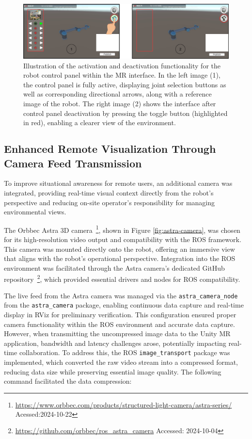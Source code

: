 \begin{figure}[h]
    \centering
    \includegraphics[width=\linewidth]{figs/mao-toca-ui-refeita-numbers.png}
    \caption{Illustration of the activation and deactivation functionality for the robot control panel within the \ac{MR} interface. In the left image (1), the control panel is fully active, displaying joint selection buttons as well as corresponding directional arrows, along with a reference image of the robot. The right image (2) shows the interface after control panel deactivation by pressing the toggle button (highlighted in red), enabling a clearer view of the environment.}
    \label{fig:menu-toggle-button}
\end{figure}



\subsection{Enhanced Remote Visualization Through Camera Feed Transmission}

To improve situational awareness for remote users, an additional camera was integrated, providing real-time visual context directly from the robot’s perspective and reducing on-site operator's responsibility for managing environmental views.

The Orbbec Astra 3D camera~\footnote{\url{https://www.orbbec.com/products/structured-light-camera/astra-series/} Acessed:2024-10-22}, shown in Figure \ref{fig:astra-camera}, was chosen for its high-resolution video output and compatibility with the \ac{ROS} framework. This camera was mounted directly onto the robot, offering an immersive view that aligns with the robot’s operational perspective. Integration into the \ac{ROS} environment was facilitated through the Astra camera’s dedicated GitHub  repository~\footnote{\url{https://github.com/orbbec/ros\_astra\_camera} Accessed: 2024-10-04}, which provided essential drivers and nodes for \ac{ROS} compatibility.

The live feed from the Astra camera was managed via the \texttt{astra\_camera\_node} from the \texttt{astra\_camera} package, enabling continuous data capture and real-time display in RViz for preliminary verification. This configuration ensured proper camera functionality within the \ac{ROS} environment and accurate data capture. However, when transmitting the uncompressed image data to the Unity \ac{MR} application, bandwidth and latency challenges arose, potentially impacting real-time collaboration. To address this, the \ac{ROS} \texttt{image\_transport} package was implemented, which converted the raw video stream into a compressed format, reducing data size while preserving essential image quality. The following command facilitated the data compression:

